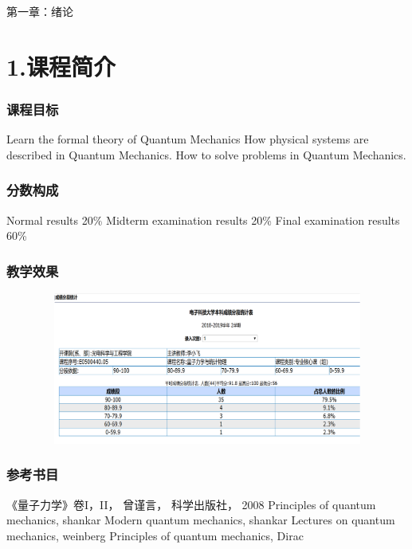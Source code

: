 \begin{frame} [plain]
    \frametitle{}
    \Background[1] 
    \begin{center}
    { {\huge 第一章：绪论 }}
    \end{center}  
    \addtocounter{framenumber}{-1}   
\end{frame}

\section{1.课程简介}

\begin{frame}
    \frametitle{课程目标}
        \begin{enumerate}
            \Item Learn the formal theory of Quantum Mechanics
            \IItem How physical systems are described in Quantum Mechanics.
            \Item How to solve problems in Quantum Mechanics.
        \end{enumerate}
\end{frame}
\begin{frame} 
    \frametitle{分数构成}
        \begin{enumerate}
            \Item Normal results 20\%
            \Item Midterm examination results 20\%
            \Item Final examination results 60\%
        \end{enumerate}
\end{frame}

\begin{frame} 
    \frametitle{教学效果}
    \centering
    \includegraphics[width=1.0\textwidth,height=5.0cm]{figs/exam1.png}
\end{frame}

\begin{frame}
    \frametitle{参考书目}
        \begin{itemize}
            \Item 《量子力学》卷I，II， 曾谨言， 科学出版社， 2008           
            \Item Principles of quantum mechanics, shankar
            \Item Modern quantum mechanics, shankar
            \Item Lectures on quantum mechanics, weinberg
            \Item Principles of quantum mechanics, Dirac
        \end{itemize}
\end{frame}

